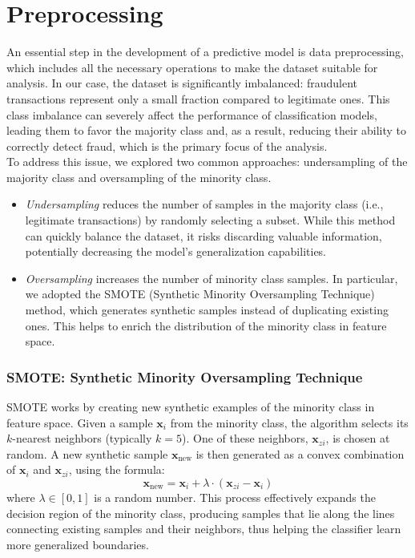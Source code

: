 \documentclass[10pt]{article}
\begin{document}
\section{Preprocessing}
An essential step in the development of a predictive model is data preprocessing, which includes all the necessary operations to make the dataset suitable for analysis. In our case, the dataset is significantly imbalanced: fraudulent transactions represent only a small fraction compared to legitimate ones. This class imbalance can severely affect the performance of classification models, leading them to favor the majority class and, as a result, reducing their ability to correctly detect fraud, which is the primary focus of the analysis.\\
To address this issue, we explored two common approaches: undersampling of the majority class and oversampling of the minority class.
\begin{itemize}
    \item \textit{Undersampling} reduces the number of samples in the majority class (i.e., legitimate transactions) by randomly selecting a subset. While this method can quickly balance the dataset, it risks discarding valuable information, potentially decreasing the model’s generalization capabilities.
    \item \textit{Oversampling} increases the number of minority class samples. In particular, we adopted the SMOTE (Synthetic Minority Oversampling Technique) method, which generates synthetic samples instead of duplicating existing ones. This helps to enrich the distribution of the minority class in feature space.
\end{itemize}
\subsubsection*{SMOTE: Synthetic Minority Oversampling Technique}
SMOTE works by creating new synthetic examples of the minority class in feature space. Given a sample \( \mathbf{x}_i \) from the minority class, the algorithm selects its \( k \)-nearest neighbors (typically \( k = 5 \)). One of these neighbors, \( \mathbf{x}_{zi} \), is chosen at random. A new synthetic sample \( \mathbf{x}_{\text{new}} \) is then generated as a convex combination of \( \mathbf{x}_i \) and \( \mathbf{x}_{zi} \), using the formula:
\[
\mathbf{x}_{\text{new}} = \mathbf{x}_i + \lambda \cdot (\mathbf{x}_{zi} - \mathbf{x}_i)
\]
where \( \lambda \in [0, 1] \) is a random number. This process effectively expands the decision region of the minority class, producing samples that lie along the lines connecting existing samples and their neighbors, thus helping the classifier learn more generalized boundaries.
\end{document}
